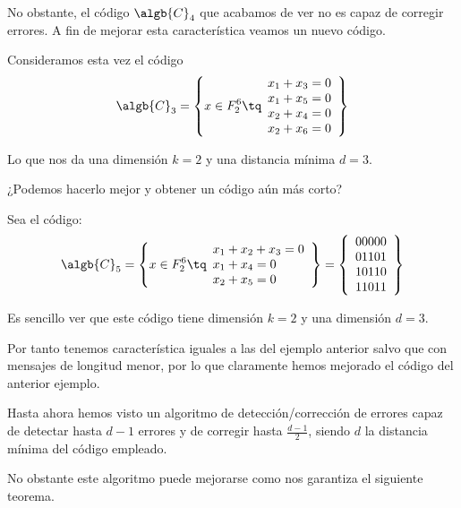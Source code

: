 No obstante, el código $\algb{C}_4$ que acabamos de ver no es capaz de corregir errores. A fin de mejorar esta característica veamos un nuevo código.

\begin{example}
Consideramos esta vez el código
\[\algb{C}_3 = \left\{x\in F_2^6 \tq  \begin{array}{l}
x_1+x_3 = 0 \\
x_1+x_5 = 0 \\
x_2+x_4 = 0 \\
x_2+x_6 = 0
\end{array}\right\}\]

Lo que nos da una dimensión $k= 2$ y una distancia mínima $d=3$.
\end{example}

¿Podemos hacerlo mejor y obtener un código aún más corto?

\begin{example}
Sea el código:
\[\algb{C}_5 = \left\{x\in F_2^6 \tq  \begin{array}{l}
x_1+x_2+x_3= 0 \\
x_1+x_4 = 0 \\
x_2+x_5 = 0
\end{array}\right\}=\left\{\begin{array}{l}
00000\\
01101\\
10110\\
11011
\end{array}\right\}\]

Es sencillo ver que este código tiene dimensión $k=2$ y una dimensión $d=3$.

Por tanto tenemos característica iguales a las del ejemplo anterior salvo que con mensajes de longitud menor, por lo que claramente hemos mejorado el código del anterior ejemplo.
\end{example}

Hasta ahora hemos visto un algoritmo de detección/corrección de errores capaz de detectar hasta $d-1$ errores y de corregir hasta $\frac{d-1}{2}$, siendo $d$ la distancia mínima del código empleado.

No obstante este algoritmo puede mejorarse como nos garantiza el siguiente teorema.

